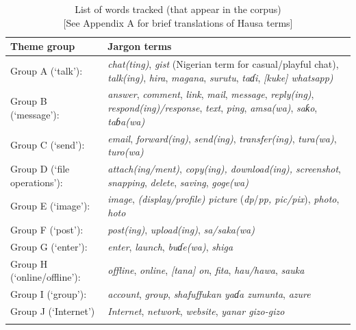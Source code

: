 \documentclass[output=paper,newtxmath,modfonts,nonflat,hidelinks]{langsci/langscibook}
\begin{document}
\begin{table}
\begin{tabularx}{\textwidth}{lQ}
\lsptoprule
{ Theme group} &  Jargon terms\\
\midrule
Group A (‘talk’): & {\textit{chat(ting)}, \textit{gist} (Nigerian  term for casual/playful chat), \textit{talk(ing)}, \textit{hira}, \textit{magana}, \textit{surutu}, \textit{taɗi}, \textit{[kuke] whatsapp)}}\\
\tablevspace
Group B (‘message’): & {\textit{answer}, \textit{comment}, \textit{link}, \textit{mail}, \textit{message}, \textit{reply(ing)}, \textit{respond(ing)/response}, \textit{text}, \textit{ping}, \textit{amsa(wa)}, \textit{saƙo}, \textit{taɓa(wa)}}\\
Group C (‘send’): & {\textit{email}, \textit{forward(ing)}, \textit{send(ing)}, \textit{transfer(ing)}, \textit{tura(wa)}, \textit{turo(wa)}}\\
\tablevspace
Group D (‘file operations’): & {\textit{attach(ing/ment)}, \textit{copy(ing), download(ing), screenshot}, \textit{snapping}, \textit{delete}, \textit{saving}, \textit{goge(wa)}}\\
\tablevspace
Group E (‘image’): & {\textit{image}, \textit{(display/profile) picture} (\textit{dp}/\textit{pp, pic/pix}), \textit{photo}, \textit{hoto}}\\
\tablevspace
Group F (‘post’): & {\textit{post(ing)}, \textit{upload(ing)}, \textit{sa/saka(wa)}}\\
\tablevspace
Group G (‘enter’): & {\textit{enter}, \textit{launch}, \textit{buɗe(wa)}, \textit{shiga}}\\
\tablevspace
Group H (‘online/offline’): & {\textit{offline}, \textit{online}, \textit{[tana] on}, \textit{fita}, \textit{hau/hawa}, \textit{sauka}}\\
\tablevspace
Group I (‘group’): & {\textit{account}, \textit{group}, \textit{shafuffukan yaɗa zumunta}, \textit{azure}}\\
\tablevspace
Group J (‘Internet’) & {\textit{Internet}, \textit{network}, \textit{website}, \textit{yanar gizo-gizo}}\\
\lspbottomrule
\end{tabularx} 
\caption{List of words tracked (that appear in the corpus)\\{}[See Appendix A for brief translations of Hausa terms]}
\label{tab:purvis:2}
\end{table} 
 
\end{document}
